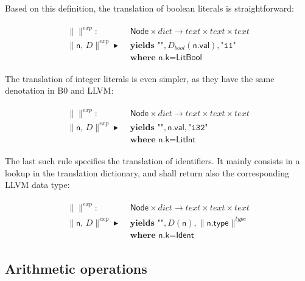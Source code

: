\documentclass{article}
\newcommand{\trad}[2]{\ensuremath{\lVert \textsf{#1} \rVert^{\textit{#2}}}}
\DeclareMathOperator{\isdef}{\blacktriangleright}
\begin{document}
Based on this definition, the translation of boolean literals is straightforward:
\begin{framed}
\begin{align}
\begin{split}
  \trad{}{exp} : & \textsf{ Node} \times dict \rightarrow text \times text \times  text  \\
  \trad{n, $D$}{exp} \isdef & \textbf{ yields } \texttt{""}, D_{bool}(\textsf{n.val}), \texttt{"i1"} \\
  & \textbf{ where } \textsf{n.k} = \textsf{LitBool}
\end{split}
\end{align}
\end{framed}

The translation of integer literals is even simpler, as they have the
same denotation in B0 and LLVM:
\begin{framed}
\begin{align}
\begin{split}
 \trad{}{exp} : & \textsf{ Node} \times dict \rightarrow text  \times text \times  text\\
  \trad{n, $D$}{exp} \isdef & \textbf{ yields } \texttt{""}, \textsf{n.val}, \texttt{"i32"} \\
  & \textbf{ where } \textsf{n.k} = \textsf{LitInt}
\end{split}
\end{align}
\end{framed}

The last such rule specifies the translation of identifiers. It mainly
consists in a lookup in the translation dictionary, and shall return
also the corresponding LLVM data type:

\begin{framed}
\begin{align}
\begin{split}
  \trad{}{exp} : & \textsf{ Node} \times dict \rightarrow text \times text \times  text\\
  \trad{n, $D$}{exp} \isdef & \textbf{ yields } \texttt{""}, D(\textsf{n}), \trad{n.type}{type} \\
  & \textbf{ where } \textsf{n.k} = \textsf{Ident}
\end{split}
\end{align}
\end{framed}

\subsection{Arithmetic operations}
\label{sec:arith}
\end{document}
